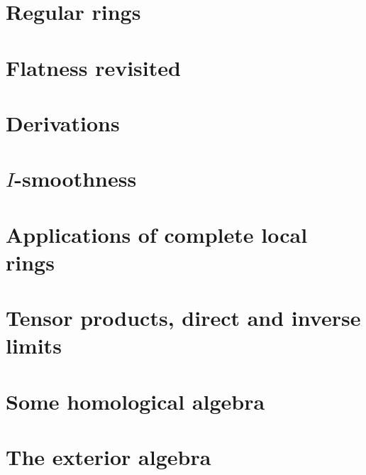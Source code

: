 \chapter{Regular rings}\label{mcrt-ch7}


\chapter{Flatness revisited}\label{mcrt-ch8}
\chapter{Derivations}\label{mcrt-ch9}
\chapter{$I$-smoothness}\label{mcrt-ch10}
\chapter{Applications of complete local rings}\label{mcrt-ch11}
\appendix
\chapter{Tensor products, direct and inverse limits}\label{mcrt-app-a}
\chapter{Some homological algebra}\label{mcrt-app-b}
\chapter{The exterior algebra}\label{mcrt-app-c}
